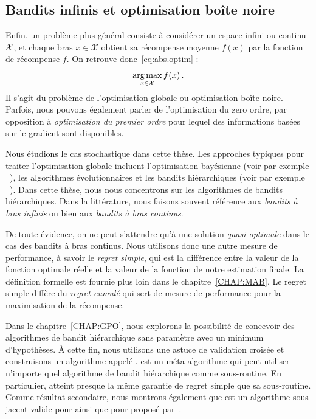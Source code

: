 \subsection{Bandits infinis et optimisation bo\^ite noire}\label{sec:abs.mab.bbo}

Enfin, un problème plus général consiste à considérer un espace infini ou continu $\mathcal{X}$, et chaque bras $x\in\mathcal{X}$ obtient sa récompense moyenne $f(x)$ par la fonction de récompense $f$. On retrouve donc~\eqref{eq:abs.optim} :
\[
    \operatorname*{arg\,max}_{x\in\mathcal{X}} f(x)\,.
\]
Il s'agit du problème de l'optimisation globale ou optimisation bo\^ite noire. Parfois, nous pouvons également parler de l'optimisation du zero ordre, par opposition à \emph{optimisation du premier ordre} pour lequel des informations basées sur le gradient sont disponibles.

Nous étudions le cas stochastique dans cette thèse. Les approches typiques pour traiter l'optimisation globale incluent l'optimisation bay\'esienne (voir par exemple ~\citealt{brochu2010bayesian}), les algorithmes évolutionnaires et les bandits hiérarchiques (voir par exemple ~\citealt{bubeck2010x}). Dans cette thèse, nous nous concentrons sur les algorithmes de bandits hiérarchiques. Dans la littérature, nous faisons souvent référence aux \emph{bandits à bras infinis} ou bien aux \emph{bandits à bras continus}.

De toute évidence, on ne peut s'attendre qu'à une solution \emph{quasi-optimale} dans le cas des bandits à bras continus. Nous utilisons donc une autre mesure de performance, à savoir le \emph{regret simple}, qui est la différence entre la valeur de la fonction optimale réelle et la valeur de la fonction de notre estimation finale. La définition formelle est fournie plus loin dans le chapitre~\ref{CHAP:MAB}.
Le regret simple diffère du \emph{regret cumul\'e} qui sert de mesure de performance pour la maximisation de la récompense. 

Dans le chapitre~\ref{CHAP:GPO}, nous explorons la possibilité de concevoir des algorithmes de bandit hiérarchique sans paramètre avec un minimum d'hypothèses. À cette fin, nous utilisons une astuce de validation croisée et construisons un algorithme appelé \GPO{}. \GPO{} est un méta-algorithme qui peut utiliser n'importe quel algorithme de bandit hiérarchique comme sous-routine. En particulier, \GPO{} atteint presque la même garantie de regret simple que sa sous-routine. Comme résultat secondaire, nous montrons également que \HCT{} est un algorithme sous-jacent valide pour \GPO{} ainsi que pour \POO{} proposé par~\cite{grill2015poo}. 

